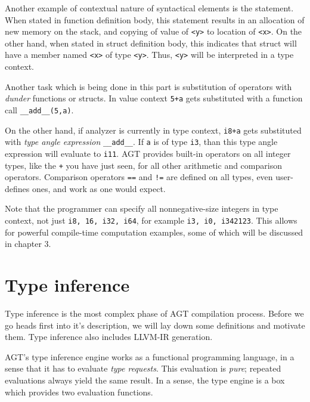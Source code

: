 \documentclass[times, utf8, diplomski]{fer}
\theoremstyle{definition}
\newcommand{\pythoncode}[3]{
    
}
\begin{document}
\pythoncode{\resdir/compiler/initex.py}{semana}{a}

Another example of contextual nature of syntactical elements is the  statement.
When stated in function definition body, this statement results in an allocation 
of new memory on the stack,
and copying of value of \texttt{<y>} to location of \texttt{<x>}.
On the other hand, when stated in struct definition body, this indicates that
struct will have a member named \texttt{<x>} of type \texttt{<y>}. 
Thus, \texttt{<y>} will be interpreted in a type context.

Another task which is being done in this part is substitution of operators with 
\textit{dunder} functions or structs. In value context \texttt{5+a} gets
substituted with a function call \texttt{\_\_add\_\_(5,a)}. 

On the other hand,
if analyzer is currently in type context, \texttt{i8+a} gets substituted with
\textit{type angle expression} \texttt{\_\_add\_\_<i8, a>}. If \texttt{a} is of type \texttt{i3},
than this type angle expression will evaluate to \texttt{i11}. AGT provides built-in operators
on all integer types, like the \texttt{+} you have just seen, for all other arithmetic and
comparison operators. Comparison operators \texttt{==} and \texttt{!=} are defined on all types, 
even user-defines ones, and work as one would expect.

Note that the programmer can specify all nonnegative-size 
integers in type context, not just \texttt{i8, 16, i32, i64},
for example \texttt{i3, i0, i342123}.
This allows for powerful compile-time computation examples, 
some of which will be discussed in chapter 3.







\section{Type inference}

Type inference is the most complex phase of AGT compilation process.
Before we go heads first into it's description, we will lay down some definitions
and motivate them. Type inference also includes LLVM-IR generation. 

AGT's type inference engine works as a functional programming language,
in a sense that it has to evaluate \textit{type requests}.
This evaluation is \textit{pure}; repeated evaluations always yield the same result.
In a sense, the type engine is a box which provides two evaluation functions.
\end{document}
